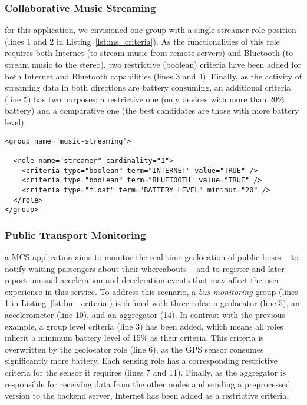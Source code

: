 \subsubsection{Collaborative Music Streaming} for this application, we envisioned one group with a single streamer role position (lines 1 and 2 in Listing~\ref{lst:ms_criteria}). As the functionalities of this role requires both Internet (to stream music from remote servers) and Bluetooth (to stream music to the stereo), two restrictive (boolean) criteria have been added for both Internet and Bluetooth capabilities (lines 3 and 4). Finally, as the activity of streaming data in both directions are battery consuming, an additional criteria (line 5) has two purposes: a restrictive one (only devices with more than 20\% battery) and a comparative one (the best candidates are those with more battery level).

\begin{lstlisting}[caption=Specification of the music streaming group, label=lst:ms_criteria, captionpos=t]
<group name="music-streaming">

  <role name="streamer" cardinality="1">
    <criteria type="boolean" term="INTERNET" value="TRUE" />
    <criteria type="boolean" term="BLUETOOTH" value="TRUE" />
    <criteria type="float" term="BATTERY_LEVEL" minimum="20" />
  </role>
</group>
\end{lstlisting}

\subsubsection{Public Transport Monitoring}  

a MCS application aims to monitor the real-time geolocation of public buses -- to notify waiting passengers about their whereabouts -- and to register and later report unusual acceleration and deceleration events that may affect the user experience in this service. To address this scenario, a \textit{bus-monitoring} group (lines 1 in Listing~\ref{lst:bm_criteria}) is defined with three roles: a geolocator (line 5), an accelerometer (line 10), and an aggregator (14). In contrast with the previous example, a group level criteria (line 3) has been added, which means all roles inherit a minimum battery level of 15\% as their criteria. This criteria is overwritten by the geolocator role (line 6), as the GPS sensor consumes significantly more battery. Each sensing role has a corresponding restrictive criteria for the sensor it requires (lines 7 and 11). Finally, as the aggregator is responsible for receiving data from the other nodes and sending a preprocessed version to the backend server, Internet has been added as a restrictive criteria.

